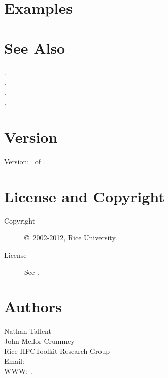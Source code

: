 \documentclass[english]{article}
\begin{document}
\section{Examples}






\section{See Also}

.\\
.\\
.\\
.

\section{Version}

Version: \Version\ of \Date.

\section{License and Copyright}

\begin{description}
\item[Copyright] \copyright\ 2002-2012, Rice University.
\item[License] See .
\end{description}

\section{Authors}

\noindent
Nathan Tallent \\
John Mellor-Crummey \\
Rice HPCToolkit Research Group \\
Email:  \\
WWW: .

\LatexManEnd
\end{document}
